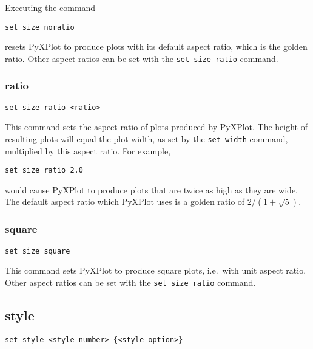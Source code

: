 Executing the command

\begin{verbatim}
set size noratio
\end{verbatim}

\noindent resets PyXPlot to produce plots with its default aspect ratio, which
is the golden ratio. Other aspect ratios can be set with the {\tt set size
ratio} command.


\subsubsection{ratio}

\begin{verbatim}
set size ratio <ratio>
\end{verbatim}

This command sets the aspect ratio of plots produced by PyXPlot.  The height of
resulting plots will equal the plot width, as set by the {\tt set width}
command, multiplied by this aspect ratio.  For example,

\begin{verbatim}
set size ratio 2.0
\end{verbatim}

\noindent would cause PyXPlot to produce plots that are twice as high as they
are wide.  The default aspect ratio which PyXPlot uses is a golden ratio of
$2/(1+\sqrt{5})$.


\subsubsection{square}

\begin{verbatim}
set size square
\end{verbatim}

This command sets PyXPlot to produce square plots, i.e.\ with unit aspect
ratio. Other aspect ratios can be set with the {\tt set size ratio} command.


\subsection{style}

\begin{verbatim}
set style <style number> {<style option>}
\end{verbatim}

